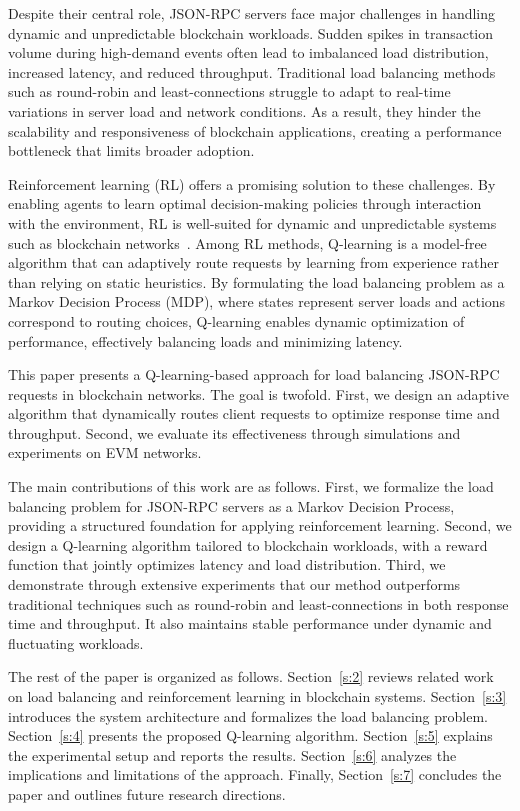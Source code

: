 \documentclass[lnbip]{svmultln}
\begin{document}
Despite their central role, JSON-RPC servers face major challenges in handling dynamic and unpredictable blockchain workloads. Sudden spikes in transaction volume during high-demand events often lead to imbalanced load distribution, increased latency, and reduced throughput. Traditional load balancing methods such as round-robin and least-connections struggle to adapt to real-time variations in server load and network conditions. As a result, they hinder the scalability and responsiveness of blockchain applications, creating a performance bottleneck that limits broader adoption.

Reinforcement learning (RL) offers a promising solution to these challenges. By enabling agents to learn optimal decision-making policies through interaction with the environment, RL is well-suited for dynamic and unpredictable systems such as blockchain networks~\cite{sutton1998}. Among RL methods, Q-learning is a model-free algorithm that can adaptively route requests by learning from experience rather than relying on static heuristics. By formulating the load balancing problem as a Markov Decision Process (MDP), where states represent server loads and actions correspond to routing choices, Q-learning enables dynamic optimization of performance, effectively balancing loads and minimizing latency.

This paper presents a Q-learning-based approach for load balancing JSON-RPC requests in blockchain networks. The goal is twofold. First, we design an adaptive algorithm that dynamically routes client requests to optimize response time and throughput. Second, we evaluate its effectiveness through simulations and experiments on EVM networks.

The main contributions of this work are as follows. First, we formalize the load balancing problem for JSON-RPC servers as a Markov Decision Process, providing a structured foundation for applying reinforcement learning. Second, we design a Q-learning algorithm tailored to blockchain workloads, with a reward function that jointly optimizes latency and load distribution. Third, we demonstrate through extensive experiments that our method outperforms traditional techniques such as round-robin and least-connections in both response time and throughput. It also maintains stable performance under dynamic and fluctuating workloads.

The rest of the paper is organized as follows. Section~\ref{s:2} reviews related work on load balancing and reinforcement learning in blockchain systems. Section~\ref{s:3} introduces the system architecture and formalizes the load balancing problem. Section~\ref{s:4} presents the proposed Q-learning algorithm. Section~\ref{s:5} explains the experimental setup and reports the results. Section~\ref{s:6} analyzes the implications and limitations of the approach. Finally, Section~\ref{s:7} concludes the paper and outlines future research directions.
\end{document}
